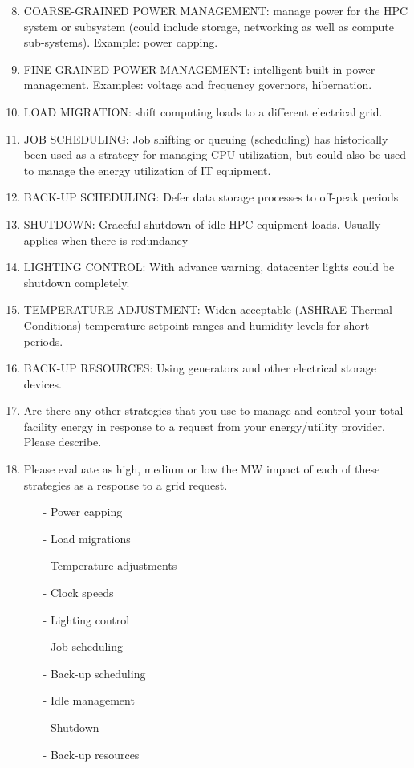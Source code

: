 \begin {enumerate} [nosep]
\setcounter{enumi}{7}
\item
COARSE-GRAINED POWER MANAGEMENT: manage power for the HPC system or subsystem 
(could include storage, networking as well as compute sub-systems). Example: power capping.

\item
FINE-GRAINED POWER MANAGEMENT: intelligent built-in power management. 
Examples: voltage and frequency governors, hibernation.

\item
LOAD MIGRATION: shift computing loads to a different electrical grid. 

\item
JOB SCHEDULING: Job shifting or queuing (scheduling) has historically been used 
as a strategy for managing CPU utilization, but could also be used to manage the 
energy utilization of IT equipment.

\item
BACK-UP SCHEDULING: Defer data storage processes to off-peak periods 

\item
SHUTDOWN: Graceful shutdown of idle HPC equipment loads. Usually applies when there is redundancy

\item
LIGHTING CONTROL: With advance warning, datacenter lights could be shutdown completely.

\item
TEMPERATURE ADJUSTMENT: Widen acceptable (ASHRAE Thermal Conditions) temperature setpoint 
ranges and humidity levels for short periods. 

\item
BACK-UP RESOURCES: Using generators and other electrical storage devices.

\item
Are there any other strategies that you use to manage and control your total 
facility energy in response to a request from your energy/utility provider.
Please describe.

\item
Please evaluate as high, medium or low the MW impact of each of these strategies 
as a response to a grid request. 

\begin{itemize} [nosep]
\item[{-}]
Power capping 
\item[{-}]
Load migrations	
\item[{-}]
Temperature adjustments	
\item[{-}]
Clock speeds	
\item[{-}]
Lighting control	
\item[{-}]
Job scheduling	
\item[{-}]
Back-up scheduling	
\item[{-}]
Idle management	
\item[{-}]
Shutdown	
\item[{-}]
Back-up resources	
\end{itemize}
\end{enumerate}

